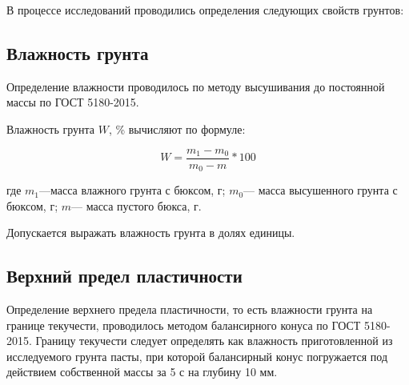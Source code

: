 В процессе исследований проводились определения следующих свойств грунтов:

\subsection{Влажность грунта}

Определение влажности проводилось по методу высушивания до постоянной массы по ГОСТ 5180-2015. 
%

Влажность грунта $W$, \% вычисляют по формуле:

\[
   W = \frac{m_1-m_0}{m_0-m}*100
\]

где $m_1$---масса влажного грунта с бюксом, г;
$m_0$--- масса высушенного грунта с бюксом, г;
$m$--- масса пустого бюкса, г.

Допускается выражать влажность грунта в долях единицы.

\subsection{Верхний предел пластичности}

Определение верхнего предела пластичности, то есть влажности грунта на границе текучести, 
проводилось методом балансирного конуса по ГОСТ 5180-2015.
Границу текучести следует определять как влажность приготовленной из исследуемого грунта пасты, 
при которой балансирный конус погружается
под действием собственной массы за 5 с на глубину 10 мм.

